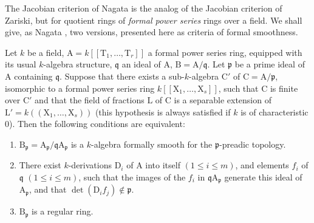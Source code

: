 \begin{env}[22.7.1]
\label{0.22.7.1}
The Jacobian criterion of Nagata is the analog of the Jacobian criterion of Zariski, but for quotient rings of \emph{formal power series} rings over a field.
We shall give, as Nagata \cite{IV-31}, two versions, presented here as criteria of formal smoothness.
\end{env}

\begin{proposition}[22.7.2]
\label{0.22.7.2}
Let $k$ be a field, $\mathrm{A}=k[[\mathrm{T}_1,\ldots,\mathrm{T}_r]]$ a formal power series ring, equipped with its usual $k$-algebra structure, $\mathfrak{q}$ an ideal of $\mathrm{A}$, $\mathrm{B}=\mathrm{A}/\mathfrak{q}$.
Let $\mathfrak{p}$ be a prime ideal of $\mathrm{A}$ containing $\mathfrak{q}$.
Suppose that there exists a sub-$k$-algebra $\mathrm{C}'$ of $\mathrm{C}=\mathrm{A}/\mathfrak{p}$, isomorphic to a formal power series ring $k[[\mathrm{X}_1,\ldots,\mathrm{X}_s]]$, such that $\mathrm{C}$ is finite over $\mathrm{C}'$ and that the field of fractions $\mathrm{L}$ of $\mathrm{C}$ is a separable extension of $\mathrm{L}'=k((\mathrm{X}_1,\ldots,\mathrm{X}_s))$ (this hypothesis is always satisfied if $k$ is of characteristic $0$).
Then the following conditions are equivalent:
\begin{enumerate}
  \item[a)] $\mathrm{B}_\mathfrak{p}=\mathrm{A}_\mathfrak{p}/\mathfrak{q}\mathrm{A}_\mathfrak{p}$ is a $k$-algebra formally smooth for the $\mathfrak{p}$-preadic topology.
  \item[b)] There exist $k$-derivations $\mathrm{D}_i$ of $\mathrm{A}$ into itself $(1\leq i\leq m)$, and elements $f_i$ of $\mathfrak{q}$ $(1\leq i\leq m)$, such that the images of the $f_i$ in $\mathfrak{q}\mathrm{A}_\mathfrak{p}$ generate this ideal of $\mathrm{A}_\mathfrak{p}$, and that $\det(\mathrm{D}_if_j)\notin\mathfrak{p}$.
  \item[c)] $\mathrm{B}_\mathfrak{p}$ is a regular ring.
\end{enumerate}
\end{proposition}

